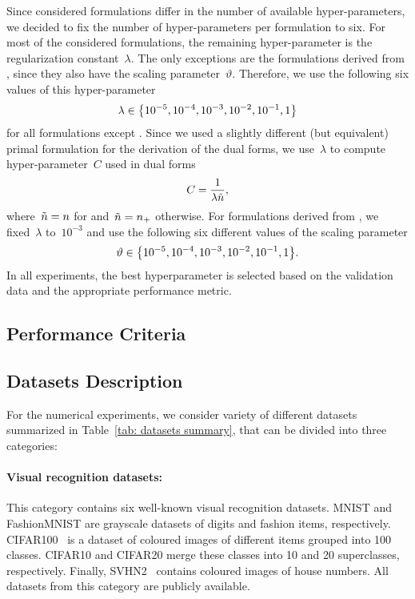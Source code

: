 Since considered formulations differ in the number of available hyper-parameters, we decided to fix the number of hyper-parameters per formulation to six. For most of the considered formulations, the remaining hyper-parameter is the regularization constant~$\lambda$. The only exceptions are the formulations derived from \PatMatNP, since they also have the scaling parameter~$\vartheta.$ Therefore, we use the following six values of this hyper-parameter
\begin{equation*}
  \lambda \in \Brac[c]{10^{-5}, 10^{-4}, 10^{-3}, 10^{-2}, 10^{-1}, 1}
\end{equation*}
for all formulations except \PatMatNP. Since we used a slightly different (but equivalent) primal formulation for the derivation of the dual forms, we use~$\lambda$ to compute hyper-parameter~$C$ used in dual forms
\begin{equation*}
  C = \frac{1}{\lambda \tilde{n}},
\end{equation*}
where~$\tilde{n} = n$ for \SVM and~$\tilde{n} = n_{+}$ otherwise. For formulations derived from \PatMatNP, we fixed~$\lambda$ to~$10^{-3}$ and use the following six different values of the scaling parameter
\begin{equation*}
  \vartheta \in \Brac[c]{10^{-5}, 10^{-4}, 10^{-3}, 10^{-2}, 10^{-1}, 1}.
\end{equation*}
In all experiments, the best hyperparameter is selected based on the validation data and the appropriate performance metric.

\subsection{Performance Criteria}

\subsection{Datasets Description}

For the numerical experiments, we consider variety of different datasets summarized in Table~\ref{tab: datasets summary}, that can be divided into three categories:

\paragraph*{Visual recognition datasets:}

This category contains six well-known visual recognition datasets. MNIST \cite{deng2012mnist} and FashionMNIST \cite{xiao2017fashionmnist} are grayscale datasets of digits and fashion items, respectively. CIFAR100~\cite{krizhevsky2009learning} is a dataset of coloured images of different items grouped into 100 classes. CIFAR10 and CIFAR20 merge these classes into 10 and 20 superclasses, respectively. Finally, SVHN2~\cite{netzer2011reading} contains coloured images of house numbers. All datasets from this category are publicly available.

